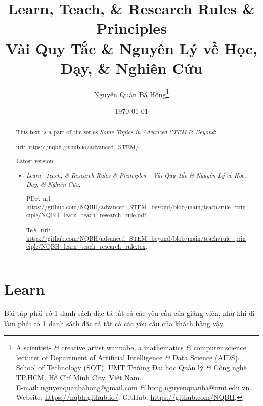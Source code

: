 \documentclass{article}
\title{Learn, Teach, \& Research Rules \& Principles\\Vài Quy Tắc \& Nguyên Lý về Học, Dạy, \& Nghiên Cứu}
\author{Nguyễn Quản Bá Hồng\footnote{A scientist- {\it\&} creative artist wannabe, a mathematics {\it\&} computer science lecturer of Department of Artificial Intelligence {\it\&} Data Science (AIDS), School of Technology (SOT), UMT Trường Đại học Quản lý {\it\&} Công nghệ TP.HCM, Hồ Chí Minh City, Việt Nam.\\E-mail: {\sf nguyenquanbahong@gmail.com} {\it\&} {\sf hong.nguyenquanba@umt.edu.vn}. Website: \url{https://nqbh.github.io/}. GitHub: \url{https://github.com/NQBH}.}}
\date{\today}
\begin{document}
\maketitle
\begin{abstract}
	This text is a part of the series {\it Some Topics in Advanced STEM \& Beyond}:
	
	{\sc url}: \url{https://nqbh.github.io/advanced_STEM/}.
	
	Latest version:
	\begin{itemize}
		\item {\it Learn, Teach, \& Research Rules \& Principles -- Vài Quy Tắc \& Nguyên Lý về Học, Dạy, \& Nghiên Cứu}.
		
		PDF: {\sc url}: \url{https://github.com/NQBH/advanced_STEM_beyond/blob/main/teach/rule_principle/NQBH_learn_teach_research_rule.pdf}.
		
		\TeX: {\sc url}: \url{https://github.com/NQBH/advanced_STEM_beyond/blob/main/teach/rule_principle/NQBH_learn_teach_research_rule.tex}.
	\end{itemize}
\end{abstract}
\tableofcontents


\section{Learn}
Bài tập phải có 1 danh sách đặc tả tất cả các yêu cầu của giảng viên, như khi đi làm phải có 1 danh sách đặc tả tất cả các yêu cầu của khách hàng vậy.
\end{document}
